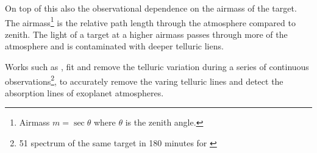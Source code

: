 On top of this also the observational dependence on the airmass of the target. 
The airmass\footnote{Airmass $m=\sec{\theta}$ where $\theta$ is the zenith angle.} is the relative path length through the atmosphere compared to zenith. 
The light of a target at a higher airmass passes through more of the atmosphere and is contaminated with deeper telluric liens. 


Works such as \citet{snellen_orbital_2010}, fit and remove the telluric variation during a series of continuous observations\footnote{51 spectrum of the same target in 180 minutes for \citet{snellen_orbital_2010}}, to accurately remove the varing telluric lines and detect the absorption lines of exoplanet atmospheres.


